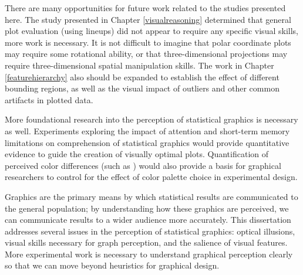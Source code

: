 \documentclass[11pt]{isuthesis}\usepackage[]{graphicx}\usepackage[]{color}
\begin{document}
There are many opportunities for future work related to the studies presented here. The study presented in Chapter \ref{visualreasoning} determined that general plot evaluation (using lineups) did not appear to require any specific visual skills, more work is necessary. It is not difficult to imagine that polar coordinate plots may require some rotational ability, or that three-dimensional projections may require three-dimensional spatial manipulation skills. The work in Chapter \ref{featurehierarchy} also should be expanded to establish the effect of different bounding regions, as well as the visual impact of outliers  and other common artifacts in plotted data. 

More foundational research into the perception of statistical graphics is necessary as well. Experiments exploring the impact of attention and short-term memory limitations on comprehension of statistical graphics would provide quantitative evidence to guide the creation of visually optimal plots. Quantification of perceived color differences (such as \citet{heer:2014}) would also provide a basis for graphical researchers to control for the effect of color palette choice in experimental design.

Graphics are the primary means by which statistical results are communicated to the general population; by understanding how these graphics are perceived, we can communicate results to a wider audience more accurately. This dissertation addresses several issues in the perception of statistical graphics: optical illusions, visual skills necessary for graph perception, and the salience of visual features. More experimental work is necessary to understand graphical perception clearly so that we can move beyond heuristics for graphical design. 
% 
% 

\end{document}
